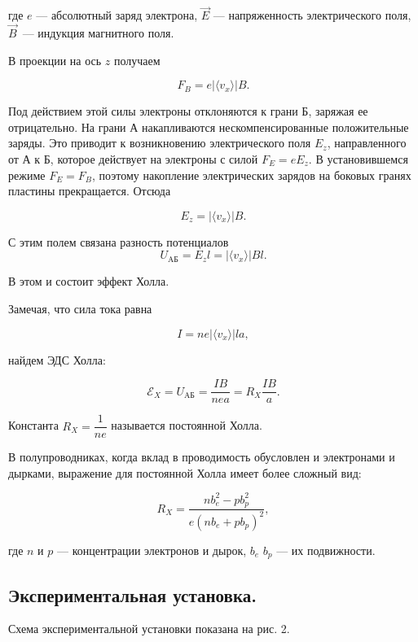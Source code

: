 \documentclass[a4paper]{article}
\theoremstyle{definition}
\theoremstyle{remark}
\begin{document}
	где $e$ --- абсолютный заряд электрона, $\vec{E}$ --- напряженность электрического поля, $\vec{B}$~--- индукция магнитного поля. \medskip
	
	В проекции на ось $z$ получаем
	
	$$ F_{B}=e | \langle {v_{x}} \rangle | B.$$
	
	Под действием этой силы электроны отклоняются к грани Б, заряжая ее отрицательно. На грани А накапливаются нескомпенсированные положительные заряды. Это приводит к возникновению электрического поля $E_{z}$, направленного от А к Б, которое действует на электроны с силой $F_{E}=eE_{z}$. В установившемся режиме $F_{E}=F_{B}$, поэтому накопление электрических зарядов на боковых гранях пластины прекращается. Отсюда
	
	$$ E_{z}=| \langle {v_{x}} \rangle | B.$$
	
	С этим полем связана разность потенциалов $$U_{\text{AБ}}=E_{z}l=| \langle {v_{x}} \rangle | Bl.$$
	
	В этом и состоит эффект Холла. \medskip
	
	\noindent Замечая, что сила тока равна
	
	$$ I=ne| \langle {v_{x}} \rangle |la,$$
	
	найдем ЭДС Холла:
	
\begin{equation*}\label{Rx}
	\mathscr{E}_{X}=U_{\text{AБ}}=\dfrac{IB}{nea}=R_{X}\dfrac{IB}{a}.
\end{equation*}
	
	Константа $R_{X}=\dfrac{1}{ne}$ называется постоянной Холла. \medskip
	
	В полупроводниках, когда вклад в проводимость обусловлен и электронами и дырками, выражение для постоянной Холла имеет более сложный вид:
	
	$$R_{X}=\dfrac{nb^{2}_{e}-pb^{2}_{p}}{e(nb_{e}+pb_{p})^{2}},$$
	
	где $n$ и $p$ --- концентрации электронов и дырок, $b_{e}$ $b_{p}$ --- их подвижности.
	
	\subsection{Экспериментальная установка.}
	Схема экспериментальной установки показана на рис. 2.
	
\end{document}
